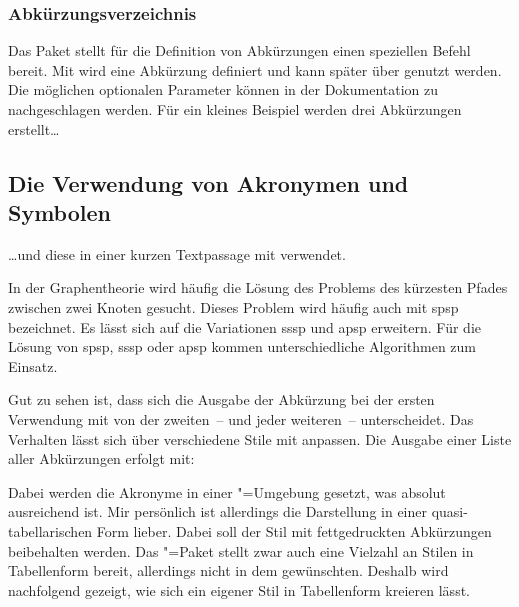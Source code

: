 \documentclass[%
  english,ngerman,%
  cdgeometry=no,DIV=12,automark,%
]{tudscrartcl}
\begin{document}
\subsubsection{Abkürzungsverzeichnis}
Das Paket  stellt für die Definition von Abkürzungen einen 
speziellen Befehl bereit. Mit\LParameter{}%
 wird eine Abkürzung definiert und 
kann später über  genutzt werden. Die möglichen optionalen 
Parameter können in der Dokumentation zu  nachgeschlagen 
werden. Für ein kleines Beispiel werden drei Abkürzungen erstellt\dots
%
\begin{Trunk+}
\section{Die Verwendung von Akronymen und Symbolen}
\end{Trunk+}
\begin{Trunk*}

\end{Trunk*}
%
\dots und diese in einer kurzen Textpassage mit  
verwendet.
%
\begin{Trunk*}
In der Graphentheorie wird häufig die Lösung des Problems des kürzesten
Pfades zwischen zwei Knoten gesucht. Dieses Problem wird häufig auch
mit \gls{spsp} bezeichnet. Es lässt sich auf die Variationen \gls{sssp}
und \gls{apsp} erweitern. Für die Lösung von \gls{spsp}, \gls{sssp} 
oder \gls{apsp} kommen unterschiedliche Algorithmen zum Einsatz.

\end{Trunk*}
%
Gut zu sehen ist, dass sich die Ausgabe der Abkürzung bei der ersten Verwendung 
mit  von der zweiten~-- und jeder weiteren~-- unterscheidet. Das 
Verhalten lässt sich über verschiedene Stile mit  
anpassen. Die Ausgabe einer Liste aller Abkürzungen erfolgt mit:
%
\begin{Hint}
\printacronyms
\end{Hint}
\begin{quoting}[rightmargin=0pt]
\vspace*{-\baselineskipglue}
\glsdisablehyper
\InputCode
\end{quoting}
%
Dabei werden die Akronyme in einer "=Umgebung gesetzt, 
was absolut ausreichend ist. Mir persönlich ist allerdings die Darstellung in 
einer quasi-tabellarischen Form lieber. Dabei soll der Stil mit fettgedruckten 
Abkürzungen beibehalten werden. Das "=Paket stellt zwar 
auch eine Vielzahl an Stilen in Tabellenform bereit, allerdings nicht in dem 
gewünschten. Deshalb wird nachfolgend gezeigt, wie sich ein eigener Stil in 
Tabellenform kreieren lässt.
\end{document}
